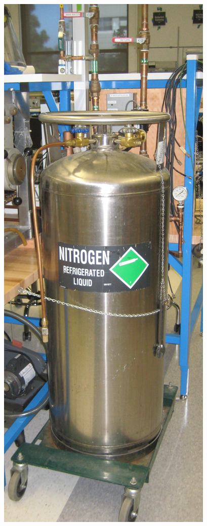 \documentclass{../lab}
\begin{document}
\begin{figure}[!htb]
  \label{fig:Magnet_Backside_Polepieces_Crop_3307.jpg}
\endminipage\hfill
{}
  \href{http://experimentationlab.berkeley.edu/sites/default/files/images/SHE_LN-2_Crop_3542.jpg}{\includegraphics[width=\linewidth,keepaspectratio]{images/SHE_LN-2_Crop_3542.jpg}}

\end{figure}
\end{document}
